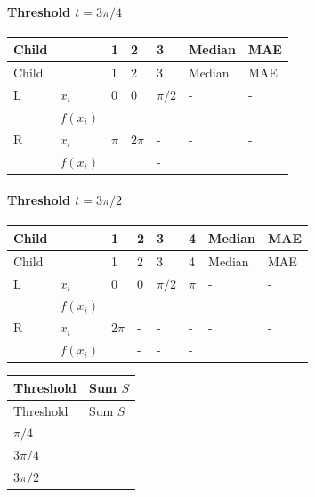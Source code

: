 \documentclass{course_sheet}
\begin{document}
\paragraph*{Threshold $t=3\pi/4$}
\begingroup
\small
\setlength{\tabcolsep}{4pt}
\begin{longtable}{l|l|l|l|l|l|l}
Child &  & 1 & 2 & 3 & Median & MAE \\
\hline
\endfirsthead
Child &  & 1 & 2 & 3 & Median & MAE \\
\hline
\endhead
L & $x_i$ & $0$ & $0$ & $\pi/2$ & - & - \\[3pt]
 & $f(x_i)$ & $\phantom{0}$ & $\phantom{0}$ & $\phantom{0}$ & $\phantom{0}$ & $\phantom{0}$ \\[3pt]
R & $x_i$ & $\pi$ & $2\pi$ & - & - & - \\[3pt]
 & $f(x_i)$ & $\phantom{0}$ & $\phantom{0}$ & - & $\phantom{0}$ & $\phantom{0}$ \\[3pt]
\end{longtable}
\endgroup
\paragraph*{Threshold $t=3\pi/2$}
\begingroup
\small
\setlength{\tabcolsep}{4pt}
\begin{longtable}{l|l|l|l|l|l|l|l}
Child &  & 1 & 2 & 3 & 4 & Median & MAE \\
\hline
\endfirsthead
Child &  & 1 & 2 & 3 & 4 & Median & MAE \\
\hline
\endhead
L & $x_i$ & $0$ & $0$ & $\pi/2$ & $\pi$ & - & - \\[3pt]
 & $f(x_i)$ & $\phantom{0}$ & $\phantom{0}$ & $\phantom{0}$ & $\phantom{0}$ & $\phantom{0}$ & $\phantom{0}$ \\[3pt]
R & $x_i$ & $2\pi$ & - & - & - & - & - \\[3pt]
 & $f(x_i)$ & $\phantom{0}$ & - & - & - & $\phantom{0}$ & $\phantom{0}$ \\[3pt]
\end{longtable}
\endgroup
\begingroup
\small
\setlength{\tabcolsep}{4pt}
\begin{longtable}{l|l}
Threshold & Sum $S$ \\
\hline
\endfirsthead
Threshold & Sum $S$ \\
\hline
\endhead
$\pi/4$ & $\phantom{0}$ \\[3pt]
$3\pi/4$ & $\phantom{0}$ \\[3pt]
$3\pi/2$ & $\phantom{0}$ \\[3pt]
\end{longtable}
\endgroup
\end{document}
